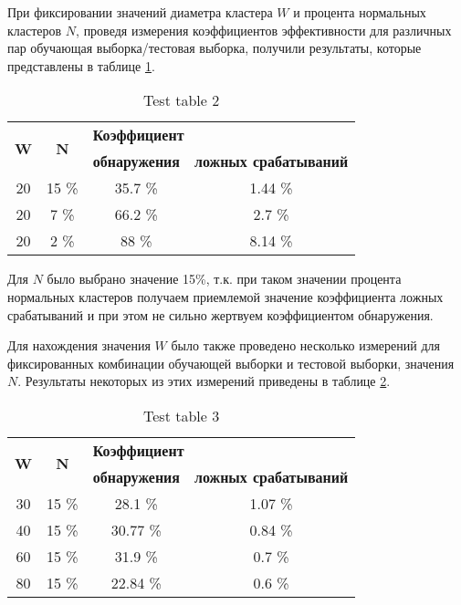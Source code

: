 \documentclass[12pt,a4paper]{article}
\begin{document}
При фиксировании значений диаметра кластера $W$ и процента нормальных кластеров $N$, проведя измерения коэффициентов
эффективности для различных пар обучающая выборка/тестовая выборка, получили результаты, которые представлены в таблице \ref{table:fix_width}.

\begin{table}
	\caption{Test table 2}
	\label{table:fix_width}
	\begin{center}
		\begin{tabular}{|c|c|c|c|}
		\hline

		\hline
		\multirow{2}{*}{\textbf{W}} & \multirow{2}{*}{\textbf{N}} & \multicolumn{2}{|l|}{\textbf{\hspace{45pt}Коэффициент}} \\
		& & \multicolumn{1}{|c|}{\textbf{обнаружения}} & \multicolumn{1}{|c|}{\textbf{ложных срабатываний}} \\
		\hline 20 & 15 \% & 35.7 \% & 1.44 \% \\
		\hline 20 & 7 \% & 66.2 \% & 2.7 \% \\
		\hline 20 & 2 \% & 88 \% & 8.14 \% \\
		\hline

		\hline
		\end{tabular}
	\end{center}
\end{table}


Для $N$ было выбрано значение 15\%, т.к. при таком значении процента нормальных кластеров получаем приемлемой значение коэффициента ложных срабатываний и при этом не сильно жертвуем коэффициентом обнаружения. 

Для нахождения значения $W$ было также проведено несколько измерений для фиксированных комбинации обучающей выборки и тестовой выборки, значения $N$. Результаты некоторых из этих измерений приведены в таблице \ref{table:fix_n}.

\begin{table}
	\caption{Test table 3}
	\label{table:fix_n}
	\begin{center}
		\begin{tabular}{|c|c|c|c|}
		\hline

		\hline
		\multirow{2}{*}{\textbf{W}} & \multirow{2}{*}{\textbf{N}} & \multicolumn{2}{|l|}{\textbf{\hspace{45pt}Коэффициент}} \\
		& & \multicolumn{1}{|c|}{\textbf{обнаружения}} & \multicolumn{1}{|c|}{\textbf{ложных срабатываний}} \\
		\hline 30 & 15 \% & 28.1  \% & 1.07 \% \\
		\hline 40 & 15 \% & 30.77 \% & 0.84 \% \\
		\hline 60 & 15 \% & 31.9  \% & 0.7  \% \\
		\hline 80 & 15 \% & 22.84 \% & 0.6  \% \\
		\hline

		\hline
		\end{tabular}
	\end{center}
\end{table}
\end{document}
